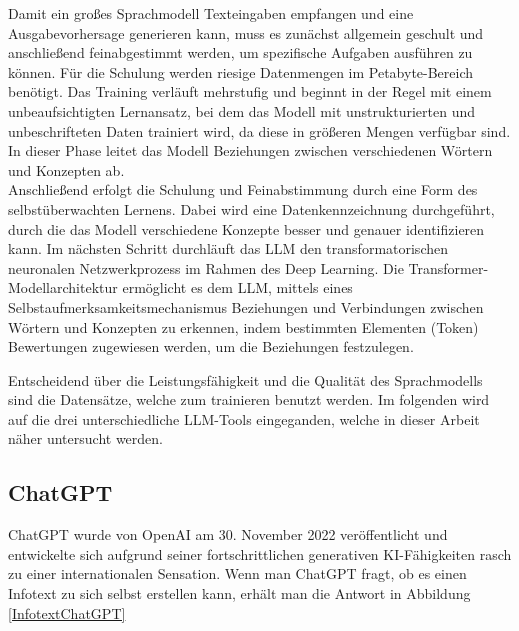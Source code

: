 Damit ein großes Sprachmodell Texteingaben empfangen und eine Ausgabevorhersage generieren kann, muss es zunächst 
allgemein geschult und anschließend feinabgestimmt werden, um spezifische Aufgaben ausführen zu können. Für die 
Schulung werden riesige Datenmengen im Petabyte-Bereich benötigt. Das Training verläuft mehrstufig und beginnt in 
der Regel mit einem unbeaufsichtigten Lernansatz, bei dem das Modell mit unstrukturierten und unbeschrifteten Daten 
trainiert wird, da diese in größeren Mengen verfügbar sind. In dieser Phase leitet das Modell Beziehungen zwischen 
verschiedenen Wörtern und Konzepten ab.\\
Anschließend erfolgt die Schulung und Feinabstimmung durch eine Form des selbstüberwachten Lernens. Dabei wird eine 
Datenkennzeichnung durchgeführt, durch die das Modell verschiedene Konzepte besser und genauer identifizieren kann. 
Im nächsten Schritt durchläuft das LLM den transformatorischen neuronalen Netzwerkprozess im Rahmen des Deep Learning. 
Die Transformer-Modellarchitektur ermöglicht es dem LLM, mittels eines Selbstaufmerksamkeitsmechanismus Beziehungen 
und Verbindungen zwischen Wörtern und Konzepten zu erkennen, indem bestimmten Elementen (Token) Bewertungen zugewiesen 
werden, um die Beziehungen festzulegen.

Entscheidend über die Leistungsfähigkeit und die Qualität des Sprachmodells sind die Datensätze, welche zum trainieren
benutzt werden. Im folgenden wird auf die drei unterschiedliche LLM-Tools eingeganden, welche in dieser Arbeit näher 
untersucht werden\cite{GrundlagenLLM}. 

\subsection{ChatGPT}  \label{ChatGPT}


ChatGPT wurde von OpenAI am 30. November 2022 veröffentlicht und entwickelte sich aufgrund seiner fortschrittlichen 
generativen KI-Fähigkeiten rasch zu einer internationalen Sensation. Wenn man ChatGPT fragt, ob es einen Infotext 
zu sich selbst erstellen kann, erhält man die Antwort in Abbildung \ref{InfotextChatGPT}

